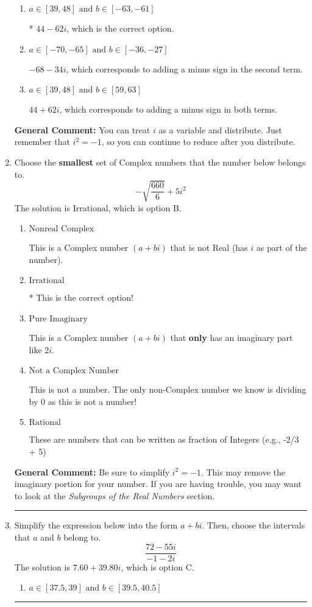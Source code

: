 \documentclass{extbook}[14pt]
\newcommand{\litem}[1]{\item #1

\rule{\textwidth}{0.4pt}}
\begin{document}
\begin{enumerate}
{\begin{enumerate}[label=\Alph*.]
 $-68 + 34 i$, which corresponds to adding a minus sign in the first term.
\item \( a \in [39, 48] \text{ and } b \in [-63, -61] \)

* $44 - 62 i$, which is the correct option.
\item \( a \in [-70, -65] \text{ and } b \in [-36, -27] \)

 $-68 - 34 i$, which corresponds to adding a minus sign in the second term.
\item \( a \in [39, 48] \text{ and } b \in [59, 63] \)

 $44 + 62 i$, which corresponds to adding a minus sign in both terms.
\end{enumerate}

\textbf{General Comment:} You can treat $i$ as a variable and distribute. Just remember that $i^2=-1$, so you can continue to reduce after you distribute.
}
\litem{
Choose the \textbf{smallest} set of Complex numbers that the number below belongs to.
\[ -\sqrt{\frac{660}{6}}+5i^2 \]The solution is \( \text{Irrational} \), which is option B.\begin{enumerate}[label=\Alph*.]
\item \( \text{Nonreal Complex} \)

This is a Complex number $(a+bi)$ that is not Real (has $i$ as part of the number).
\item \( \text{Irrational} \)

* This is the correct option!
\item \( \text{Pure Imaginary} \)

This is a Complex number $(a+bi)$ that \textbf{only} has an imaginary part like $2i$.
\item \( \text{Not a Complex Number} \)

This is not a number. The only non-Complex number we know is dividing by 0 as this is not a number!
\item \( \text{Rational} \)

These are numbers that can be written as fraction of Integers (e.g., -2/3 + 5)
\end{enumerate}

\textbf{General Comment:} Be sure to simplify $i^2 = -1$. This may remove the imaginary portion for your number. If you are having trouble, you may want to look at the \textit{Subgroups of the Real Numbers} section.
}
\litem{
Simplify the expression below into the form $a+bi$. Then, choose the intervals that $a$ and $b$ belong to.
\[ \frac{72 - 55 i}{-1 - 2 i} \]The solution is \( 7.60  + 39.80 i \), which is option C.\begin{enumerate}[label=\Alph*.]
\item \( a \in [37.5, 39] \text{ and } b \in [39.5, 40.5] \)


\end{enumerate}}
\end{enumerate}
\end{document}
